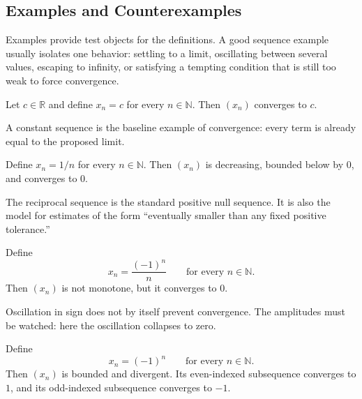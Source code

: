 \subsection*{Examples and Counterexamples}
\begin{exposition}
Examples provide test objects for the definitions. A good sequence example
usually isolates one behavior: settling to a limit, oscillating between
several values, escaping to infinity, or satisfying a tempting condition that
is still too weak to force convergence.
\end{exposition}

\begin{example*}
\label{ex:sequence-example-constant}
Let $c\in\mathbb{R}$ and define $x_n=c$ for every $n\in\mathbb{N}$. Then
$(x_n)$ converges to $c$.
\end{example*}

\begin{remark*}[Interpretation]
A constant sequence is the baseline example of convergence: every term is
already equal to the proposed limit.
\end{remark*}

\begin{example*}
\label{ex:sequence-example-reciprocal}
Define $x_n=1/n$ for every $n\in\mathbb{N}$. Then $(x_n)$ is decreasing,
bounded below by $0$, and converges to $0$.
\end{example*}

\begin{remark*}[Interpretation]
The reciprocal sequence is the standard positive null sequence. It is also
the model for estimates of the form ``eventually smaller than any fixed
positive tolerance.''
\end{remark*}

\begin{example*}
\label{ex:sequence-example-alternating-null}
Define
\[
  x_n=\frac{(-1)^n}{n}
  \qquad
  \text{for every } n\in\mathbb{N}.
\]
Then $(x_n)$ is not monotone, but it converges to $0$.
\end{example*}

\begin{remark*}[Interpretation]
Oscillation in sign does not by itself prevent convergence. The amplitudes
must be watched: here the oscillation collapses to zero.
\end{remark*}

\begin{example*}
\label{ex:sequence-example-oscillating}
Define
\[
  x_n=(-1)^n
  \qquad
  \text{for every } n\in\mathbb{N}.
\]
Then $(x_n)$ is bounded and divergent. Its even-indexed subsequence converges
to $1$, and its odd-indexed subsequence converges to $-1$.
\end{example*}

